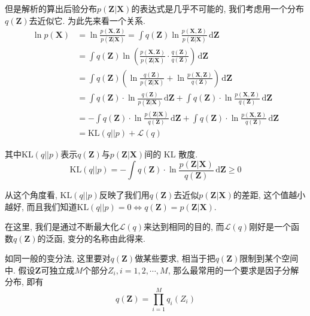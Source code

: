 \documentclass[a4paper,UTF8]{ctexart}
\theoremstyle{plain} \newtheorem{theorem}{定理}[section]
\theoremstyle{plain} \newtheorem{definition}{定义}[section]
\theoremstyle{plain} \newtheorem{lemma}{引理}[section]
\theoremstyle{plain} \newtheorem{proposition}{命题}[section]
\theoremstyle{plain} \newtheorem{example}{例}[section]
\theoremstyle{plain} \newtheorem{remark}{注}[section]
\theoremstyle{plain} \newtheorem{corollary}{推论}[section]
\newcommand\diff{\,{\mathrm d}} %
\begin{document}
但是解析的算出后验分布$p(\bm{Z} | \bm{X})$的表达式是几乎不可能的, 我们考虑用一个分布$q(\bm{Z})$去近似它. 为此先来看一个关系.
\begin{align*}
\ln p(\bm{X}) & = \ln \frac{p(\bm{X}, \bm{Z})}{p(\bm{Z} | \bm{X})}  = \int q(\bm{Z}) \ln \frac{p(\bm{X}, \bm{Z})}{p(\bm{Z} | \bm{X})} \diff \bm{Z} \\
& = \int q(\bm{Z}) \ln \left( \frac{p(\bm{X}, \bm{Z})}{p(\bm{Z} | \bm{X})} \cdot \frac{q(\bm{Z})}{q(\bm{Z})} \right) \diff \bm{Z} \\
& = \int q(\bm{Z}) \left( \ln \frac{q(\bm{Z})}{p(\bm{Z} | \bm{X})} + \ln \frac{p(\bm{X}, \bm{Z})}{q(\bm{Z})} \right) \diff \bm{Z} \\
& = \int q(\bm{Z}) \cdot \ln \frac{q(\bm{Z})}{p(\bm{Z} | \bm{X})} \diff \bm{Z} + \int q(\bm{Z}) \cdot \ln \frac{p(\bm{X}, \bm{Z})}{q(\bm{Z})} \diff \bm{Z} \\
& = - \int q(\bm{Z}) \cdot \ln \frac{p(\bm{Z} | \bm{X})}{q(\bm{Z})} \diff \bm{Z} + \int q(\bm{Z}) \cdot \ln \frac{p(\bm{X}, \bm{Z})}{q(\bm{Z})} \diff \bm{Z} \\
& = \mathrm{KL}(q||p) + \mathcal{L}(q)
\end{align*}

其中$\mathrm{KL}(q || p)$表示$q(\bm{Z})$与$p(\bm{Z} | \bm{X})$间的 KL 散度.
\begin{equation*}
\mathrm{KL}(q || p) = - \int q(\bm{Z}) \cdot \ln \frac{p(\bm{Z} | \bm{X})}{q(\bm{Z})} \diff \bm{Z} \geqslant 0
\end{equation*}

从这个角度看, $\mathrm{KL}(q || p)$反映了我们用$q(\bm{Z})$去近似$p(\bm{Z} | \bm{X})$的差距, 这个值越小越好, 而且我们知道$\mathrm{KL}(q || p) = 0 \Longleftrightarrow q(\bm{Z}) = p(\bm{Z} | \bm{X})$.

在这里, 我们是通过不断最大化$\mathcal{L}(q)$来达到相同的目的, 而$\mathcal{L}(q)$刚好是一个函数$q(\bm{Z})$的泛函, 变分的名称由此得来.

如同一般的变分法, 这里要对$q(\bm{Z})$做某些要求, 相当于把$q(\bm{Z})$限制到某个空间中. 假设$\bm{Z}$可独立成$M$个部分$Z_{i}, i = 1,2,\cdots,M$, 那么最常用的一个要求是因子分解分布, 即有
\begin{equation*}
q(\bm{Z}) = \prod_{i=1}^{M} q_{i}(Z_{i})
\end{equation*}
\end{document}
